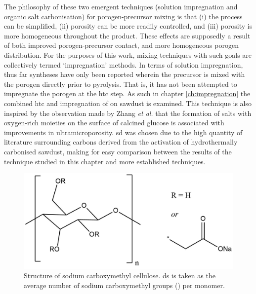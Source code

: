 The philosophy of these two emergent techniques (solution impregnation and organic salt carbonisation) for porogen-precursor mixing is that (i) the process can be simplified, (ii) porosity can be more readily controlled, and (iii) porosity is more homogeneous throughout the product. These effects are supposedly a result of both improved \gls{porogen}-precursor contact, and more homogeneous \gls{porogen} distribution. For the purposes of this work, mixing techniques with such goals are collectively termed `impregnation' methods. In terms of solution impregnation, thus far syntheses have only been reported wherein the precursor is mixed with the \gls{porogen} directly prior to pyrolysis.\citep{Botome2017Preparation, Ge2019Highly, Adlak2021Physicochemical, Shi2021Copper, Han2021Mulch, Boujibar2018CO2} That is, it has not been attempted to impregnate the \gls{porogen} at the \gls{htc} step. As such in chapter \ref{ch:impregnation} the combined \gls{htc} and impregnation of  on sawdust is examined. This technique is also inspired by the observation made by Zhang \textit{et al.} that the formation of  salts with oxygen-rich moieties on the surface of calcined glucose is associated with improvements in ultramicroporosity.\citep{Zhang2019situ} \acrfull{sd} was chosen due to the high quantity of literature surrounding carbons derived from the activation of hydrothermally carbonised sawdust,\citep{Balahmar2019Pre, Aljumialy2020Porous, Cox2017Ultra, Balahmar2015Generalized} making for easy comparison between the results of the technique studied in this chapter and more established techniques.

\begin{figure}[ht!]
    \centering
    \includegraphics[width=0.8\columnwidth]{4-impregnation/figs/nc_structure.png}
    \caption{Structure of sodium carboxymethyl cellulose. \Acrfull{ds} is taken as the average number of sodium carboxymethyl groups () per monomer.}
    \label{fig:nc_structure}
\end{figure}

